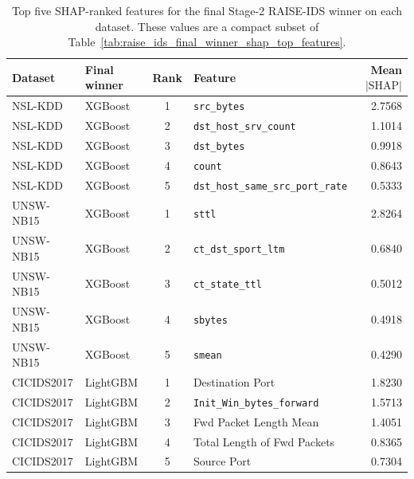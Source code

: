 \begin{table}[!htbp]
\centering
\caption{Top five SHAP-ranked features for the final Stage-2 RAISE-IDS winner on each dataset. These values are a compact subset of Table~\ref{tab:raise_ids_final_winner_shap_top_features}.}
\label{tab:shap_top5}
\small
\begin{tabularx}{\textwidth}{llcXr}
\toprule
Dataset & Final winner & Rank & Feature & Mean $|\mathrm{SHAP}|$ \\
\midrule
NSL-KDD & XGBoost & 1 & \texttt{src\_bytes} & 2.7568 \\
NSL-KDD & XGBoost & 2 & \texttt{dst\_host\_srv\_count} & 1.1014 \\
NSL-KDD & XGBoost & 3 & \texttt{dst\_bytes} & 0.9918 \\
NSL-KDD & XGBoost & 4 & \texttt{count} & 0.8643 \\
NSL-KDD & XGBoost & 5 & \texttt{dst\_host\_same\_src\_port\_rate} & 0.5333 \\
UNSW-NB15 & XGBoost & 1 & \texttt{sttl} & 2.8264 \\
UNSW-NB15 & XGBoost & 2 & \texttt{ct\_dst\_sport\_ltm} & 0.6840 \\
UNSW-NB15 & XGBoost & 3 & \texttt{ct\_state\_ttl} & 0.5012 \\
UNSW-NB15 & XGBoost & 4 & \texttt{sbytes} & 0.4918 \\
UNSW-NB15 & XGBoost & 5 & \texttt{smean} & 0.4290 \\
CICIDS2017 & LightGBM & 1 & Destination Port & 1.8230 \\
CICIDS2017 & LightGBM & 2 & \texttt{Init\_Win\_bytes\_forward} & 1.5713 \\
CICIDS2017 & LightGBM & 3 & Fwd Packet Length Mean & 1.4051 \\
CICIDS2017 & LightGBM & 4 & Total Length of Fwd Packets & 0.8365 \\
CICIDS2017 & LightGBM & 5 & Source Port & 0.7304 \\
\bottomrule
\end{tabularx}
\end{table}
